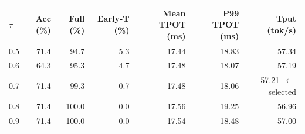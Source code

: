 \begin{tabular}{lrrrrrr}
\toprule
$\tau$ & Acc (\%) & Full (\%) & Early-T (\%) & Mean TPOT (ms) & P99 TPOT (ms) & Tput (tok/s) \\
\midrule
  0.5 & 71.4 & 94.7 & 5.3 & 17.44 & 18.83 & 57.34 \\
  0.6 & 64.3 & 95.3 & 4.7 & 17.48 & 18.07 & 57.19 \\
  0.7 & 71.4 & 99.3 & 0.7 & 17.48 & 18.06 & 57.21~$\leftarrow$ selected \\
  0.8 & 71.4 & 100.0 & 0.0 & 17.56 & 19.25 & 56.96 \\
  0.9 & 71.4 & 100.0 & 0.0 & 17.54 & 18.48 & 57.00 \\
\bottomrule
\end{tabular}

